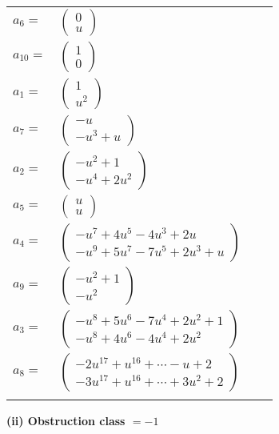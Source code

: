 \documentclass[1p]{elsarticle_modified}
\theoremstyle{definition}
\begin{document}
\begin{tabular}{m{7pt} m{180pt} m{7pt} m{180pt} }
\flushright $a_{6}=$&$\begin{pmatrix}0\\u\end{pmatrix}$ \\
\flushright $a_{10}=$&$\begin{pmatrix}1\\0\end{pmatrix}$ \\
\flushright $a_{1}=$&$\begin{pmatrix}1\\u^2\end{pmatrix}$ \\
\flushright $a_{7}=$&$\begin{pmatrix}- u\\- u^3+u\end{pmatrix}$ \\
\flushright $a_{2}=$&$\begin{pmatrix}- u^2+1\\- u^4+2 u^2\end{pmatrix}$ \\
\flushright $a_{5}=$&$\begin{pmatrix}u\\u\end{pmatrix}$ \\
\flushright $a_{4}=$&$\begin{pmatrix}- u^7+4 u^5-4 u^3+2 u\\- u^9+5 u^7-7 u^5+2 u^3+u\end{pmatrix}$ \\
\flushright $a_{9}=$&$\begin{pmatrix}- u^2+1\\- u^2\end{pmatrix}$ \\
\flushright $a_{3}=$&$\begin{pmatrix}- u^8+5 u^6-7 u^4+2 u^2+1\\- u^8+4 u^6-4 u^4+2 u^2\end{pmatrix}$ \\
\flushright $a_{8}=$&$\begin{pmatrix}-2 u^{17}+u^{16}+\cdots- u+2\\-3 u^{17}+u^{16}+\cdots+3 u^2+2\end{pmatrix}$\\&\end{tabular}
\flushleft \textbf{(ii) Obstruction class $= -1$}\\~\\
\end{document}
